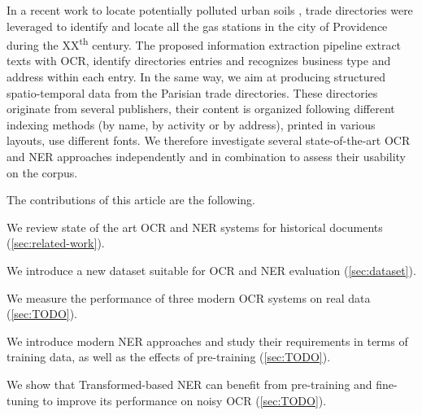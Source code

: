 In a recent work to locate potentially polluted urban soils \cite{bell2020automated}, trade directories were leveraged to identify and locate all the gas stations in the city of Providence during the XX\textsuperscript{th} century.
The proposed information extraction pipeline extract texts with OCR, identify directories entries and recognizes business type and address within each entry.
In the same way, we aim at producing structured spatio-temporal data from the Parisian trade directories.
These directories originate from several publishers, their content is organized following different indexing methods (by name, by activity or by address), printed in various layouts, use different fonts.
We therefore investigate several state-of-the-art OCR and NER approaches independently and in combination to assess their usability on the corpus.

The contributions of this article are the following. 
\begin{enumerate*}[(i)]
    \item We review state of the art OCR and NER systems for historical documents (\cref{sec:related-work}).
    \item We introduce a new dataset suitable for OCR and NER evaluation (\cref{sec:dataset}).
    \item We measure the performance of three modern OCR systems on real data (\cref{sec:TODO}).
    \item We introduce modern NER approaches and study their requirements in terms of training data, as well as the effects of pre-training (\cref{sec:TODO}).
    \item We show that Transformed-based NER can benefit from pre-training and fine-tuning to improve its performance on noisy OCR (\cref{sec:TODO}).
\end{enumerate*}


